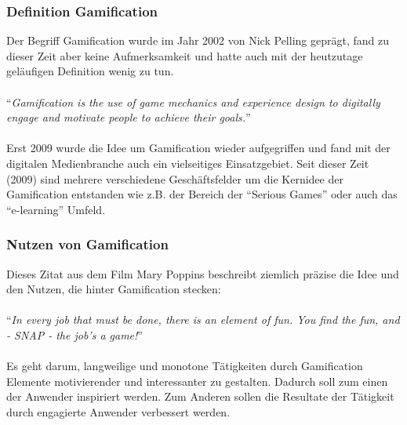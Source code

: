 \documentclass[a4paper,12pt,twoside]{scrartcl}
\begin{document}
\subsubsection{Definition Gamification}
Der Begriff Gamification wurde im Jahr 2002 von Nick Pelling geprägt, fand zu dieser Zeit aber keine Aufmerksamkeit und hatte auch mit der heutzutage geläufigen Definition wenig zu tun.
\\\\
\enquote{\textit{Gamification is the use of game mechanics and experience design to digitally engage and motivate people to achieve their goals.}}\cite{gamificationDefinition}
\\\\
Erst 2009 wurde die Idee um Gamification wieder aufgegriffen und fand mit der digitalen Medienbranche auch ein vielseitiges Einsatzgebiet. Seit dieser Zeit (2009) sind mehrere verschiedene Geschäftsfelder um die Kernidee der Gamification entstanden wie z.B. der Bereich der \enquote{Serious Games} oder auch das \enquote{e-learning} Umfeld.  

\subsubsection{Nutzen von Gamification}
Dieses Zitat aus dem Film Mary Poppins beschreibt ziemlich präzise die Idee und den Nutzen, die hinter Gamification stecken:\\\\ 
\enquote{\textit{In every job that must be done, there is an element of fun. You find the fun, and - SNAP - the job's a game!}} \footnotemark
{} 
\\\\
Es geht darum, langweilige und monotone Tätigkeiten durch Gamification Elemente motivierender und interessanter zu gestalten. Dadurch soll zum einen der Anwender inspiriert werden. Zum Anderen sollen die Resultate der Tätigkeit durch engagierte Anwender verbessert werden.
\end{document}
